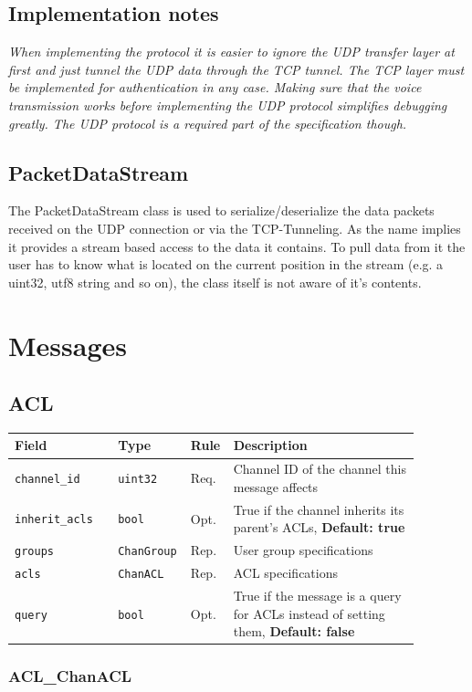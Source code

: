 \documentclass[11pt]{article} %
\newenvironment{mumbleMessageEx}
{%
	\small
	\renewcommand\arraystretch{1.5}
	\begin{tabular}{p{0.25\linewidth}p{0.13\linewidth}p{0.05\linewidth}p{0.45\linewidth}}
	Field & Type & Rule & Description \\
	\hline
}
{%
	\end{tabular}
	\renewcommand\arraystretch{1.0}
}
\newcommand{\mumbleMessageExItem}[4]{ \texttt{#1} & \texttt{#2} & #3 & #4 \\ }
\begin{document}
\subsection{Implementation notes}

\emph{\small{When implementing the protocol it is easier to ignore the UDP transfer layer at first and just tunnel the UDP data through the TCP tunnel. The TCP layer must be implemented for authentication in any case. Making sure that the voice transmission works before implementing the UDP protocol simplifies debugging greatly. The UDP protocol is a required part of the specification though.}}

\subsection {PacketDataStream}
The PacketDataStream class is used to serialize/deserialize the data packets received on the UDP connection or via the TCP-Tunneling. As the name implies it provides a stream based access to the data it contains. To pull data from it the user has to know what is located on the current position in the stream (e.g. a uint32, utf8 string and so on), the class itself is not aware of it's contents.

\section{Messages}

\subsection{ACL}
\label{msg:acl}

\begin{mumbleMessageEx}
\mumbleMessageExItem{channel\_id}{uint32}{Req.}{Channel ID of the channel this message affects}
\mumbleMessageExItem{inherit\_acls}{bool}{Opt.}{True if the channel inherits its parent's ACLs, \textbf{Default: true}}
\mumbleMessageExItem{groups}{ChanGroup}{Rep.}{User group specifications}
\mumbleMessageExItem{acls}{ChanACL}{Rep.}{ACL specifications}
\mumbleMessageExItem{query}{bool}{Opt.}{True if the message is a query for ACLs instead of setting them, \textbf{Default: false}}
\end{mumbleMessageEx}

\subsubsection{ACL\_ChanACL}
\label{msg:chanACL}
\end{document}
